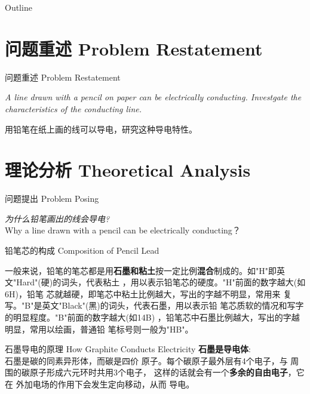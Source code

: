 \documentclass[10pt]{beamer}
\title[]{}
\author{}
\institute[]{}
\date{\today}
\begin{document}
\begin{frame}
  \titlepage
\end{frame}


\begin{frame}{Outline}
  \tableofcontents
\end{frame}


\section[Problem]{问题重述 Problem Restatement}
\begin{frame}{问题重述 Problem Restatement}
\begin{center}
\textit{\Large A line drawn with a pencil on paper can be electrically conducting. Investgate the characteristics of the conducting line.}

\bigskip
用铅笔在纸上画的线可以导电，研究这种导电特性。
\end{center}
\end{frame}


\section[Analysis]{理论分析 Theoretical Analysis}
\begin{frame}{问题提出 Problem Posing}
\begin{center}
	{\LARGE  \textit{为什么铅笔画出的线会导电?}}\\
	\large Why a line drawn with
	a pencil can be electrically conducting？
	
\end{center}
\end{frame}

\begin{frame}{铅笔芯的构成 Composition of Pencil Lead}

\qquad     一般来说，铅笔的笔芯都是用\textbf{石墨和粘土}按一定比例\textbf{混合}制成的。如"H"即英文"Hard"(硬)的词头，代表粘土
，用以表示铅笔芯的硬度。"H"前面的数字越大(如6H)，铅笔
芯就越硬，即笔芯中粘土比例越大，写出的字越不明显，常用来
复写。"B"是英文"Black"(黑)的词头，代表石墨，用以表示铅
笔芯质软的情况和写字的明显程度。"B"前面的数字越大(如14B)
，铅笔芯中石墨比例越大，写出的字越明显，常用以绘画，普通铅
笔标号则一般为"HB"。
\end{frame}




\begin{frame}{石墨导电的原理 How Graphite Conducts Electricity}
\textbf{石墨是导电体}:\\
\qquad 石墨是碳的同素异形体，而碳是四价
原子。每个碳原子最外层有4个电子，与
周围的碳原子形成六元环时共用3个电子，
这样的话就会有一个\textbf{多余的自由电子}，它在
外加电场的作用下会发生定向移动，从而
导电。
\end{frame}
\end{document}
